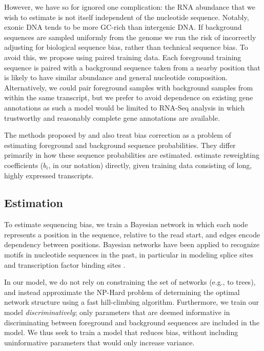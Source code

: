 \documentclass{bioinfo}
\begin{document}
However, we have so for ignored one complication: the RNA abundance that we wish
to estimate is not itself independent of the nucleotide sequence. Notably,
exonic DNA tends to be more GC-rich than intergenic DNA. If background sequences
are sampled uniformly from the genome we run the risk of incorrectly adjusting
for biological sequence bias, rather than technical sequence bias.  To avoid
this, we propose using paired training data. Each foreground training
sequence is paired with a background sequence taken from a nearby position
that is likely to have similar abundance and general nucleotide composition.
Alternatively, we could pair foreground samples with background samples from
within the same transcript, but we prefer to avoid dependence on existing
gene annotations as such a model would be limited to RNA-Seq analysis in which
trustworthy and reasonably complete gene annotations are available.

The methods proposed by \citet{Hansen2010} and \cite{Roberts2011} also treat bias
correction as a problem of estimating foreground and background sequence
probabilities. They differ primarily in how these sequence probabilities are
estimated. \citet{Li2010} estimate reweighting coefficients ($b_i$, in our
notation) directly, given training data consisting of long, highly expressed
transcripts.



\subsection{Estimation}

To estimate sequencing bias, we train a Bayesian network in which each node
represents a position in the sequence, relative to the read start, and edges
encode dependency between positions.  Bayesian networks have been applied to
recognize motifs in nucleotide sequences in the past, in particular in modeling
splice sites \citep{Cai2000, Chen2005} and transcription factor binding sites
\citep{Ben-Gal2005, Grau2006, Pudimat2005}. 

In our model, we do not rely on constraining the set of networks (e.g., to
trees), and instead approximate the NP-Hard problem of determining the optimal
network structure using a fast hill-climbing algorithm. Furthermore, we
train our model \emph{discriminatively}; only parameters that are deemed
informative in discriminating between foreground and background sequences are
included in the model. We thus seek to train a model that reduces bias, without
including uninformative parameters that would only increase variance.
\end{document}

